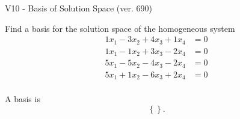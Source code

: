 \begin{exercise}
  \begin{exerciseTitle}V10 - Basis of Solution Space (ver. 690)\end{exerciseTitle}
  \begin{exerciseStatement}
    Find a basis for the solution space of the homogeneous system 
\begin{align*}
 1 x_ 1 -3 x_ 2 + 4 x_ 3 + 1 x_ 4 &= 0  \\ 
  1 x_ 1 -1 x_ 2 + 3 x_ 3 -2 x_ 4 &= 0  \\ 
  5 x_ 1 -5 x_ 2 -4 x_ 3 -2 x_ 4 &= 0  \\ 
  5 x_ 1 + 1 x_ 2 -6 x_ 3 + 2 x_ 4 &= 0  \\ 
 \end{align*}


 
  \end{exerciseStatement}

  \begin{exerciseAnswer}
   A basis is   
\[\left\{\right\}.\]

  


  \end{exerciseAnswer}
\end{exercise}